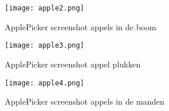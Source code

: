 \begin{figure}[h]
    \centering
    \texttt{[image: apple2.png]}
    \caption{ApplePicker screenshot appels in de boom}
\end{figure}

\begin{figure}[h]
    \centering
    \texttt{[image: apple3.png]}
    \caption{ApplePicker screenshot appel plukken}
\end{figure}

\begin{figure}[h]
    \centering
    \texttt{[image: apple4.png]}
    \caption{ApplePicker screenshot appels in de manden}
\end{figure}